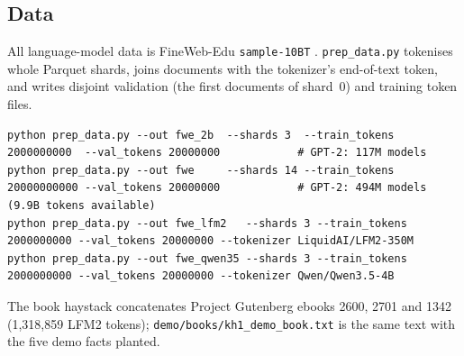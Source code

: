 \subsection{Data}
All language-model data is FineWeb-Edu \texttt{sample-10BT} \citep{fineweb2024}. \texttt{prep\_data.py} tokenises whole Parquet shards, joins documents with the tokenizer's end-of-text token, and writes disjoint validation (the first documents of shard~0) and training token files.
\begin{lstlisting}
python prep_data.py --out fwe_2b  --shards 3  --train_tokens 2000000000  --val_tokens 20000000            # GPT-2: 117M models
python prep_data.py --out fwe     --shards 14 --train_tokens 20000000000 --val_tokens 20000000            # GPT-2: 494M models (9.9B tokens available)
python prep_data.py --out fwe_lfm2   --shards 3 --train_tokens 2000000000 --val_tokens 20000000 --tokenizer LiquidAI/LFM2-350M
python prep_data.py --out fwe_qwen35 --shards 3 --train_tokens 2000000000 --val_tokens 20000000 --tokenizer Qwen/Qwen3.5-4B
\end{lstlisting}
The book haystack concatenates Project Gutenberg ebooks 2600, 2701 and 1342 (1{,}318{,}859 LFM2 tokens); \texttt{demo/books/kh1\_demo\_book.txt} is the same text with the five demo facts planted.

